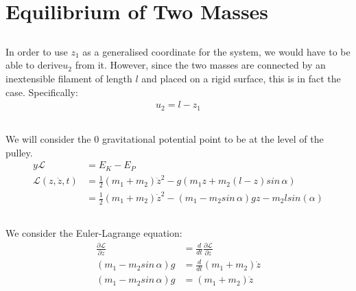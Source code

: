 \documentclass{article}
\begin{document}
\subsection{} %



\subsection{} %

\section{Equilibrium of Two Masses}

\subsection{} %

In order to use $z_1$ as a generalised coordinate for the system, we would have to be able to derive$u_2$ from it. However, since the two masses are connected by an inextensible filament of length $l$ and placed on a rigid surface, this is in fact the case. Specifically:
\begin{align*}
	u_2 = l - z_1
\end{align*}

\subsection{} %

We will consider the 0 gravitational potential point to be at the level of the pulley.
\begin{align*}y
	\mathcal{L} &= E_{K} - E_P\\
	\mathcal{L}(z,\dot{z},t) &= \frac{1}{2}(m_1+m_2)\dot{z}^2 - g(m_1z + m_2(l-z)sin\,\alpha)\\
	&= \frac{1}{2}(m_1+m_2)\dot{z}^2 - (m_1 - m_2sin\,\alpha)g z - m_2 l sin(\alpha)
\end{align*}

\subsection{} %

We consider the Euler-Lagrange equation:
\begin{align*}
	\frac{\partial \mathcal{L}}{\partial z} &= \frac{d}{dt}\frac{\partial \mathcal{L}}{\partial \dot{z}}\\
	 (m_1 - m_2sin\,\alpha)g &= \frac{d}{dt}(m_1 + m_2)\dot{z}\\
	 (m_1 - m_2sin\,\alpha)g &= (m_1 + m_2)\ddot{z}
\end{align*}
\end{document}
